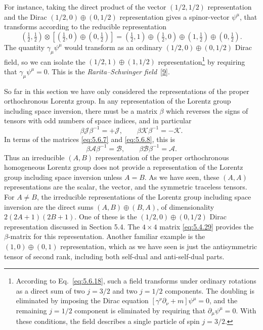 For instance, taking the direct product of the vector $(1/2,1/2)$
representation and the Dirac $(1/2,0)\oplus(0,1/2)$ representation gives a
spinor-vector $\psi^\mu$, that transforms according to the reducible
representation
\[
(\tfrac12,\tfrac12)\otimes[(\tfrac12,0)\oplus(0,\tfrac12)]
=(\tfrac12,1)\oplus(\tfrac12,0)\oplus(1,\tfrac12)\oplus(0,\tfrac12).
\]
The quantity $\gamma_\mu\psi^\mu$ would transform as an ordinary
$(1/2,0)\oplus(0,1/2)$ Dirac field, so we can isolate the
$(1/2,1)\oplus(1,1/2)$ representation\footnote{According to Eq.~\eqref{eq:5.6.18},
such a field transforms under ordinary rotations as a direct sum of two
$j=3/2$ and two $j=1/2$ components. The doubling is eliminated by imposing
the Dirac equation $[\gamma^\nu\partial_\nu+m]\psi^\mu=0$, and the remaining
$j=1/2$ component is eliminated by requiring that $\partial_\mu\psi^\mu=0$.
With these conditions, the field describes a single particle of spin $j=3/2$.}
by requiring that $\gamma_\mu\psi^\mu=0$. This is the
\emph{Rarita--Schwinger field}~\hyperref[ref:5.9]{[9]}.

So far in this section we have only considered the representations of the
proper orthochronous Lorentz group. In any representation of the Lorentz group
including space inversion, there must be a matrix $\beta$ which reverses the
signs of tensors with odd numbers of space indices, and in particular
\begin{equation}
\beta\mathcal{J}\beta^{-1}=+\mathcal{J},
\qquad
\beta\mathcal{K}\beta^{-1}=-\mathcal{K}.
\tag{5.6.19}\label{eq:5.6.19}
\end{equation}
In terms of the matrices \eqref{eq:5.6.7} and \eqref{eq:5.6.8}, this is
\begin{equation}
\beta\mathcal{A}\beta^{-1}=\mathcal{B},
\qquad
\beta\mathcal{B}\beta^{-1}=\mathcal{A}.
\tag{5.6.20}\label{eq:5.6.20}
\end{equation}
Thus an irreducible $(A,B)$ representation of the proper orthochronous
homogeneous Lorentz group does not provide a representation of the Lorentz
group including space inversion unless $A=B$. As we have seen, these $(A,A)$
representations are the scalar, the vector, and the symmetric traceless
tensors. For $A\ne B$, the irreducible representations of the Lorentz group
including space inversion are the direct sums $(A,B)\oplus(B,A)$, of
dimensionality $2(2A+1)(2B+1)$. One of these is the
$(1/2,0)\oplus(0,1/2)$ Dirac representation discussed in Section 5.4. The
$4\times4$ matrix \eqref{eq:5.4.29} provides the $\beta$-matrix for this representation.
Another familiar example is the $(1,0)\oplus(0,1)$ representation, which as we
have seen is just the antisymmetric tensor of second rank, including both
self-dual and anti-self-dual parts.
